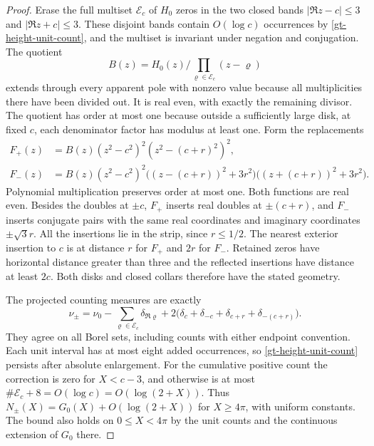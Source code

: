 \begin{proof}
Erase the full multiset \(\mathcal E_c\) of \(H_0\) zeros in
the two closed bands \(|\Re z-c|\le3\) and \(|\Re z+c|\le3\).
These disjoint bands contain \(O(\log c)\) occurrences by
\eqref{gt-height-unit-count}, and the multiset is invariant
under negation and conjugation. The quotient
\[
 B(z)=H_0(z)\Big/\prod_{\varrho\in\mathcal E_c}(z-\varrho)
\]
extends through every apparent pole with nonzero value because
all multiplicities there have been divided out. It is real even,
with exactly the remaining divisor. The quotient has order at
most one because outside a sufficiently large disk, at fixed
\(c\), each denominator factor has modulus at least one.
Form the replacements
\begin{align*}
 F_+(z)&=B(z)(z^2-c^2)^2(z^2-(c+r)^2)^2,\\
 F_-(z)&=B(z)(z^2-c^2)^2
          \bigl((z-(c+r))^2+3r^2\bigr)
          \bigl((z+(c+r))^2+3r^2\bigr).
\end{align*}
Polynomial multiplication preserves order at most one. Both
functions are real even. Besides the doubles at \(\pm c\),
\(F_+\) inserts real doubles at \(\pm(c+r)\), and \(F_-\)
inserts conjugate pairs with the same real coordinates and
imaginary coordinates \(\pm\sqrt3 r\). All the insertions
lie in the strip, since \(r\le1/2\).
The nearest exterior insertion to \(c\) is at distance \(r\)
for \(F_+\) and \(2r\) for \(F_-\). Retained zeros have horizontal
distance greater than three and the reflected insertions have
distance at least \(2c\). Both disks and closed collars
therefore have the stated geometry.

The projected counting measures are exactly
\[
 \nu_\pm=\nu_0-\sum_{\varrho\in\mathcal E_c}\delta_{\Re\varrho}
      +2\bigl(\delta_c+\delta_{-c}+\delta_{c+r}+\delta_{-(c+r)}\bigr).
\]
They agree on all Borel sets, including counts with either endpoint
convention. Each unit interval has at most eight added occurrences,
so \eqref{gt-height-unit-count} persists after absolute enlargement.
For the cumulative positive count the correction is zero for
\(X<c-3\), and otherwise is at most \(\#\mathcal E_c+8
=O(\log c)=O(\log(2+X))\). Thus
\(N_\pm(X)=G_0(X)+O(\log(2+X))\) for \(X\ge4\pi\), with uniform
constants. The bound also holds on \(0\le X<4\pi\) by the unit
counts and the continuous extension of \(G_0\) there.


\end{proof}
